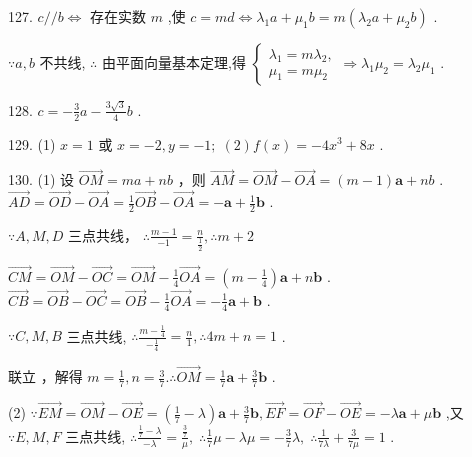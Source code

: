 \documentclass[10pt]{article}
\newcommand*\circled[1]{\tikz[baseline=(char.base)]{\node[shape=circle,draw,inner sep=1.5pt] (char) {\small #1};}}
\begin{document}
127. \(c//b \Leftrightarrow\) 存在实数 \(m\) ,使 \(c = {md} \Leftrightarrow  {\lambda }_{1}a + {\mu }_{1}b = m\left( {{\lambda }_{2}a + {\mu }_{2}b}\right)\) .

\(\because a,b\) 不共线, \(\therefore\) 由平面向量基本定理,得 \(\left\{  {\begin{array}{l} {\lambda }_{1} = m{\lambda }_{2}, \\  {\mu }_{1} = m{\mu }_{2} \end{array} \Rightarrow  {\lambda }_{1}{\mu }_{2} = {\lambda }_{2}{\mu }_{1}}\right.\) .

128. \(c =  - \frac{3}{2}a - \frac{3\sqrt{3}}{4}b\) .

129. (1) \(x = 1\) 或 \(x =  - 2,y =  - 1;\;\left( 2\right) f\left( x\right)  =  - 4{x}^{3} + {8x}\) .

130. (1) 设 \(\overrightarrow{OM} = {ma} + {nb}\) ，则 \(\overrightarrow{AM} = \overrightarrow{OM} - \overrightarrow{OA} = \left( {m - 1}\right) \mathbf{a} + {nb}\) . \(\overrightarrow{AD} = \overrightarrow{OD} - \overrightarrow{OA} = \frac{1}{2}\overrightarrow{OB} - \overrightarrow{OA} =  - \mathbf{a} + \frac{1}{2}\mathbf{b}\) .

\(\because A,M,D\) 三点共线， \(\therefore \frac{m - 1}{-1} = \frac{n}{\frac{1}{2}},\therefore m + 2\)

\(\overrightarrow{CM} = \overrightarrow{OM} - \overrightarrow{OC} = \overrightarrow{OM} - \frac{1}{4}\overrightarrow{OA} = \left( {m - \frac{1}{4}}\right) \mathbf{a} + n\mathbf{b}\) . \(\overrightarrow{CB} = \overrightarrow{OB} - \overrightarrow{OC} = \overrightarrow{OB} - \frac{1}{4}\overrightarrow{OA} =  - \frac{1}{4}\mathbf{a} + \mathbf{b}\) .

\(\because C,M,B\) 三点共线, \(\therefore \frac{m - \frac{1}{4}}{-\frac{1}{4}} = \frac{n}{1},\therefore {4m} + n = 1\) .

联立 \circled{1}  \circled{2} ，解得 \(m = \frac{1}{7},n = \frac{3}{7}.\therefore \overrightarrow{OM} = \frac{1}{7}\mathbf{a} + \frac{3}{7}\mathbf{b}\) .

(2) \(\because \overrightarrow{EM} = \overrightarrow{OM} - \overrightarrow{OE} = \left( {\frac{1}{7} - \lambda }\right) \mathbf{a} + \frac{3}{7}\mathbf{b},\overrightarrow{EF} = \overrightarrow{OF} - \overrightarrow{OE} =  - \lambda \mathbf{a} + \mu \mathbf{b}\) ,又 \(\because E,M,F\) 三点共线, \(\therefore \frac{\frac{1}{7} - \lambda }{-\lambda } = \frac{\frac{3}{7}}{\mu },\;\therefore \frac{1}{7}\mu  - {\lambda \mu } =  - \frac{3}{7}\lambda ,\;\therefore \frac{1}{7\lambda } + \frac{3}{7\mu } = 1\) .
\end{document}
